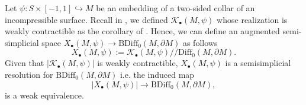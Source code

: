 \documentclass[a4paper]{amsart}
\theoremstyle{definition}
\newtheorem{defn}[thm]{Definition}
\theoremstyle{remark}
\newcommand\Diff{\mathrm{Diff}}
\newcommand\BDiff{\mathrm{BDiff}}
\newcommand{\hcoker}{/\!\!/}
\numberwithin{equation}{section}
\begin{document}
Let $\psi:S\times [-1,1]\hookrightarrow M$ be an embedding of a two-sided collar of an incompressible surface. Recall in , we defined $\mathcal{K}_{\bullet}(M,\psi)$ whose realization is weakly contractible as the corollary of . Hence, we can define  an augmented semi-simplicial space $X_{\bullet}(M,\psi)\to \BDiff_0(M,\partial M)$ as follows
\[
X_{\bullet}(M,\psi):= \mathcal{K}_{\bullet}(M,\psi)\hcoker \Diff_0(M,\partial M).
\]
Given that $|\mathcal{K}_{\bullet}(M,\psi)|$ is weakly contractible,  $X_{\bullet}(M,\psi)$ is a semisimplicial resolution for $\BDiff_0(M,\partial M)$ i.e. the induced map
\[
|X_{\bullet}(M,\psi)|\to\BDiff_0(M,\partial M),
\]
is a weak equivalence.
\end{document}
